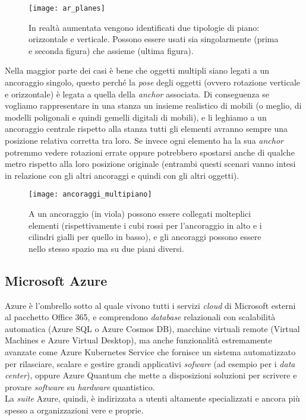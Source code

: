 \begin{figure}[H]
  \centering
  \texttt{[image: ar\_planes]}
  \caption[Piani in realtà aumentata]{In realtà aumentata vengono identificati due tipologie di piano: orizzontale e verticale. Possono essere usati sia singolarmente (prima e seconda figura) che assieme (ultima figura).}
\end{figure}

Nella maggior parte dei casi è bene che oggetti multipli siano legati a un ancoraggio singolo, questo perché la \textit{pose} degli oggetti (ovvero rotazione verticale e orizzontale) è legata a quella della \textit{anchor} associata. Di conseguenza se vogliamo rappresentare in una stanza un insieme realistico di mobili (o meglio, di modelli poligonali e quindi gemelli digitali di mobili), e li leghiamo a un ancoraggio centrale rispetto alla stanza tutti gli elementi avranno sempre una posizione relativa corretta tra loro. Se invece ogni elemento ha la sua \textit{anchor} potremmo vedere rotazioni errate oppure potrebbero spostarsi anche di qualche metro rispetto alla loro posizione originale (entrambi questi scenari vanno intesi in relazione con gli altri ancoraggi e quindi con gli altri oggetti).
\newpage
\begin{figure}[H]
  \centering
  \texttt{[image: ancoraggi\_multipiano]}
  \caption[Ancoraggi singoli per multipli elementi]{A un ancoraggio (in viola) possono essere collegati molteplici elementi (rispettivamente i cubi rossi per l'ancoraggio in alto e i cilindri gialli per quello in basso), e gli ancoraggi possono essere nello stesso spazio ma su due piani diversi.}
\end{figure}

\subsection{Microsoft Azure}
\label{subsec:azure}
Azure è l'ombrello sotto al quale vivono tutti i servizi \textit{cloud} di Microsoft esterni al pacchetto Office 365, e comprendono \textit{database} relazionali con scalabilità automatica (Azure SQL o Azure Cosmos DB), macchine virtuali remote (Virtual Machines e Azure Virtual Desktop), ma anche funzionalità estremamente avanzate come Azure Kubernetes Service che fornisce un sistema automatizzato per rilasciare, scalare e gestire grandi applicativi \textit{sofware} (ad esempio per i \textit{data center}), oppure Azure Quantum che mette a disposizioni soluzioni per scrivere e provare \textit{software} su \textit{hardware} quantistico.\\
La \textit{suite} Azure, quindi, è indirizzata a utenti altamente specializzati e ancora più spesso a organizzazioni vere e proprie.


